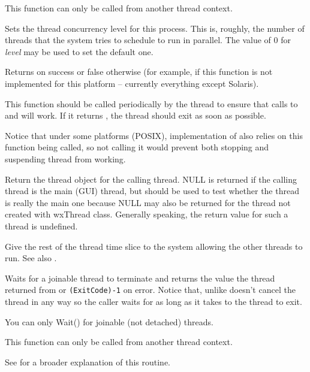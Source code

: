 This function can only be called from another thread context.


\label{wxthreadsetconcurrency}


Sets the thread concurrency level for this process. This is, roughly, the
number of threads that the system tries to schedule to run in parallel.
The value of $0$ for {\it level} may be used to set the default one.

Returns \true on success or false otherwise (for example, if this function is
not implemented for this platform -- currently everything except Solaris).


\label{wxthreadtestdestroy}


This function should be called periodically by the thread to ensure that calls
to  and  will
work. If it returns \true, the thread should exit as soon as possible.

Notice that under some platforms (POSIX), implementation of 
 also relies on this function being called, so
not calling it would prevent both stopping and suspending thread from working.


\label{wxthreadthis}


Return the thread object for the calling thread. NULL is returned if the calling thread
is the main (GUI) thread, but  should be used to test
whether the thread is really the main one because NULL may also be returned for the thread
not created with wxThread class. Generally speaking, the return value for such a thread
is undefined.


\label{wxthreadyield}


Give the rest of the thread time slice to the system allowing the other threads to run.
See also .


\label{wxthreadwait}


Waits for a joinable thread to terminate and returns the value the thread
returned from  or {\tt (ExitCode)-1} on
error. Notice that, unlike  doesn't cancel the
thread in any way so the caller waits for as long as it takes to the thread to
exit.

You can only Wait() for joinable (not detached) threads.

This function can only be called from another thread context.

See  for a broader explanation of this routine.

